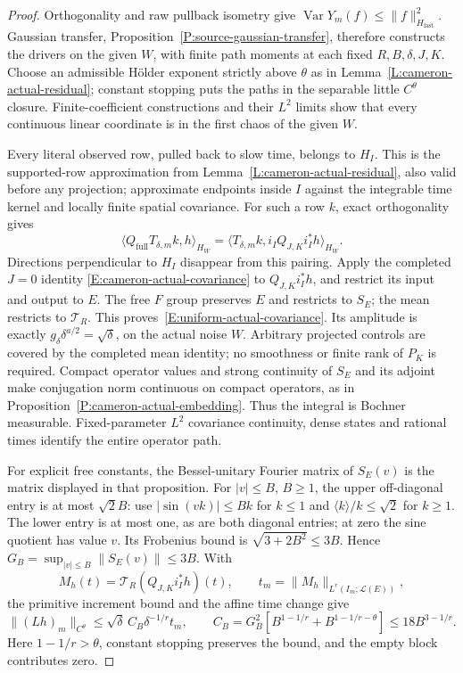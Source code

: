 \begin{proof}
  Orthogonality and raw pullback isometry give
  $\operatorname{Var}Y_m(f)\le\|f\|_{H_{\mathrm{fast}}}^2$.
  Gaussian transfer, Proposition~\ref{P:source-gaussian-transfer},
  therefore constructs the drivers on the given $W$, with finite
  path moments at each fixed $R,B,\delta,J,K$.
  Choose an admissible H\"older exponent strictly above $\theta$
  as in Lemma~\ref{L:cameron-actual-residual}; constant stopping
  puts the paths in the separable little $C^\theta$ closure.
  Finite-coefficient constructions and their $L^2$ limits show
  that every continuous linear coordinate is in the first chaos
  of the given $W$.

  Every literal observed row, pulled back to slow time, belongs
  to $H_I$. This is the supported-row approximation from
  Lemma~\ref{L:cameron-actual-residual}, also valid before any
  projection; approximate endpoints inside $I$ against the
  integrable time kernel and locally finite spatial covariance.
  For such a row $k$, exact orthogonality gives
  \[
    \langle Q_{\mathrm{full}}T_{\delta,m}k,h\rangle_{H_W}
    =\langle T_{\delta,m}k,i_IQ_{J,K}i_I^*h\rangle_{H_W}.
  \]
  Directions perpendicular to $H_I$ disappear from this pairing.
  Apply the completed $J=0$ identity
  \eqref{E:cameron-actual-covariance} to $Q_{J,K}i_I^*h$,
  and restrict its input and output to $E$.
  The free $F$ group preserves $E$ and restricts to $S_E$;
  the mean restricts to $\mathcal T_R$.
  This proves~\eqref{E:uniform-actual-covariance}.
  Its amplitude is exactly
  $g_\delta\delta^{a/2}=\sqrt\delta$, on the actual noise $W$.
  Arbitrary projected controls are covered by the completed mean
  identity; no smoothness or finite rank of $P_K$ is required.
  Compact operator values and strong continuity of $S_E$ and
  its adjoint make conjugation norm continuous on compact operators,
  as in Proposition~\ref{P:cameron-actual-embedding}.
  Thus the integral is Bochner measurable.
  Fixed-parameter $L^2$ covariance continuity, dense states and
  rational times identify the entire operator path.

  For explicit free constants, the Bessel-unitary Fourier matrix
  of $S_E(v)$ is the matrix displayed in that proposition.
  For $|v|\le B$, $B\ge1$, the upper off-diagonal entry is at most
  $\sqrt2 B$: use $|\sin(vk)|\le Bk$ for $k\le1$ and
  $\langle k\rangle/k\le\sqrt2$ for $k\ge1$.
  The lower entry is at most one, as are both diagonal entries;
  at zero the sine quotient has value $v$.
  Its Frobenius bound is $\sqrt{3+2B^2}\le3B$.
  Hence $G_B=\sup_{|v|\le B}\|S_E(v)\|\le3B$.
  With
  \[
    M_h(t)=\mathcal T_R(Q_{J,K}i_I^*h)(t),\qquad
    t_m=\|M_h\|_{L^r(I_m;\mathcal L(E))},
  \]
  the primitive increment bound and the affine time change give
  \[
    \|(Lh)_m\|_{C^\theta}
    \le\sqrt\delta\,C_B\delta^{-1/r}t_m,\qquad
    C_B=G_B^2[B^{1-1/r}+B^{1-1/r-\theta}]
    \le18B^{3-1/r}.
  \]
  Here $1-1/r>\theta$, constant stopping preserves the bound,
  and the empty block contributes zero.


\end{proof}
